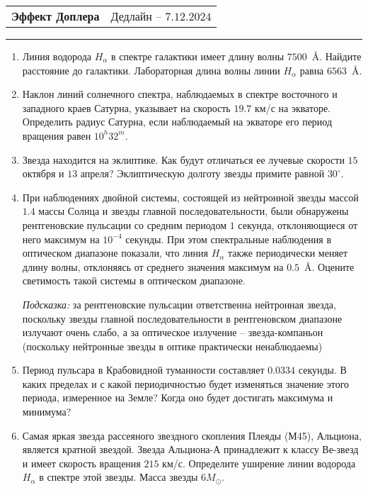 \documentclass[12pt]{article}
\begin{document}
 \begin{tabularx}{\textwidth}{Xr}
  {\Large \textbf{Эффект Доплера}} & Дедлайн -- $7.12.2024$ \\
 \end{tabularx}
 \noindent\rule{\textwidth}{0.4pt}
 \begin{enumerate}
   \item Линия водорода $H_{\alpha}$  в спектре галактики имеет длину волны $7500$~\AA. Найдите расстояние до галактики. Лабораторная длина волны линии $H_{\alpha}$ равна $6563$~\AA.
   \item Наклон линий солнечного спектра, наблюдаемых в спектре восточного и западного краев Сатурна, указывает на скорость $19.7$ км/с на экваторе. Определить радиус Сатурна, если наблюдаемый на экваторе его период вращения равен $10^h32^m$.
   \item Звезда находится на эклиптике. Как будут отличаться ее лучевые скорости $15$ октября и $13$ апреля? Эклиптическую долготу звезды примите равной $30^{\circ}$.
   \item При наблюдениях двойной системы, состоящей из нейтронной звезды массой $1.4$ массы Солнца и звезды главной последовательности, были обнаружены рентгеновские пульсации со средним периодом $1$ секунда, отклоняющиеся от него максимум на $10^{-4}$ секунды. При этом спектральные наблюдения в оптическом диапазоне показали, что линия $H_{\alpha}$ также периодически меняет длину волны, отклоняясь от среднего значения максимум на $0.5$~\AA. Оцените светимость такой системы в оптическом диапазоне.

   \textit{Подсказка:} за рентгеновские пульсации ответственна нейтронная звезда, поскольку звезды главной последовательности в рентгеновском диапазоне излучают очень слабо, а за оптическое излучение -- звезда-компаньон (поскольку нейтронные звезды в оптике практически ненаблюдаемы)
   \item Период пульсара в Крабовидной туманности составляет $0.0334$ секунды. В каких пределах и с какой периодичностью будет изменяться значение этого периода, измеренное на Земле? Когда оно будет достигать максимума и минимума?
   \item Самая яркая звезда рассеяного звездного скопления Плеяды (М45), Альциона, является кратной звездой. Звезда Альциона-А принадлежит к классу Ве-звезд и имеет скорость вращения $215$ км/с. Определите уширение линии водорода $H_{\alpha}$ в спектре этой звезды. Масса звезды $6 M_{\odot}$.
 \end{enumerate}
\end{document}
